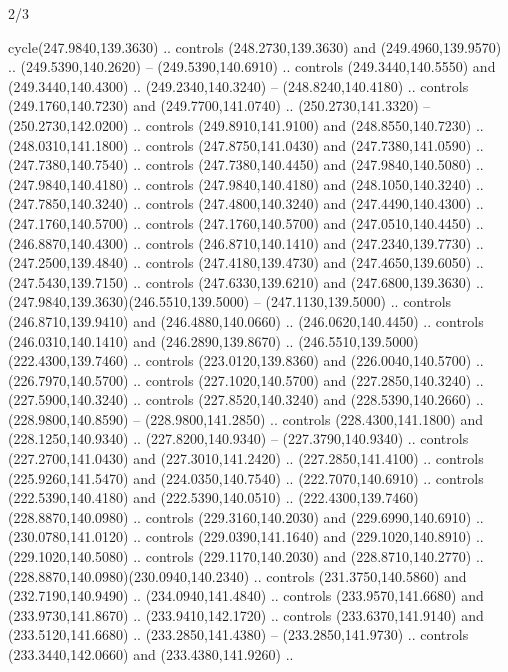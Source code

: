 \begin{flagdescription}{2/3}
\begin{scope}[xshift=0.5\flaglength,yshift=0.5\flagwidth,scale=\flagwidth/259.2]
\begin{scope}[y=0.8pt, x=0.8pt, yscale=-1,shift={(-243,-162)}]
      cycle(247.9840,139.3630) .. controls (248.2730,139.3630) and
      (249.4960,139.9570) .. (249.5390,140.2620) -- (249.5390,140.6910) .. controls
      (249.3440,140.5550) and (249.3440,140.4300) .. (249.2340,140.3240) --
      (248.8240,140.4180) .. controls (249.1760,140.7230) and (249.7700,141.0740) ..
      (250.2730,141.3320) -- (250.2730,142.0200) .. controls (249.8910,141.9100) and
      (248.8550,140.7230) .. (248.0310,141.1800) .. controls (247.8750,141.0430) and
      (247.7380,141.0590) .. (247.7380,140.7540) .. controls (247.7380,140.4450) and
      (247.9840,140.5080) .. (247.9840,140.4180) .. controls (247.9840,140.4180) and
      (248.1050,140.3240) .. (247.7850,140.3240) .. controls (247.4800,140.3240) and
      (247.4490,140.4300) .. (247.1760,140.5700) .. controls (247.1760,140.5700) and
      (247.0510,140.4450) .. (246.8870,140.4300) .. controls (246.8710,140.1410) and
      (247.2340,139.7730) .. (247.2500,139.4840) .. controls (247.4180,139.4730) and
      (247.4650,139.6050) .. (247.5430,139.7150) .. controls (247.6330,139.6210) and
      (247.6800,139.3630) .. (247.9840,139.3630)(246.5510,139.5000) --
      (247.1130,139.5000) .. controls (246.8710,139.9410) and (246.4880,140.0660) ..
      (246.0620,140.4450) .. controls (246.0310,140.1410) and (246.2890,139.8670) ..
      (246.5510,139.5000)(222.4300,139.7460) .. controls (223.0120,139.8360) and
      (226.0040,140.5700) .. (226.7970,140.5700) .. controls (227.1020,140.5700) and
      (227.2850,140.3240) .. (227.5900,140.3240) .. controls (227.8520,140.3240) and
      (228.5390,140.2660) .. (228.9800,140.8590) -- (228.9800,141.2850) .. controls
      (228.4300,141.1800) and (228.1250,140.9340) .. (227.8200,140.9340) --
      (227.3790,140.9340) .. controls (227.2700,141.0430) and (227.3010,141.2420) ..
      (227.2850,141.4100) .. controls (225.9260,141.5470) and (224.0350,140.7540) ..
      (222.7070,140.6910) .. controls (222.5390,140.4180) and (222.5390,140.0510) ..
      (222.4300,139.7460)(228.8870,140.0980) .. controls (229.3160,140.2030) and
      (229.6990,140.6910) .. (230.0780,141.0120) .. controls (229.0390,141.1640) and
      (229.1020,140.8910) .. (229.1020,140.5080) .. controls (229.1170,140.2030) and
      (228.8710,140.2770) .. (228.8870,140.0980)(230.0940,140.2340) .. controls
      (231.3750,140.5860) and (232.7190,140.9490) .. (234.0940,141.4840) .. controls
      (233.9570,141.6680) and (233.9730,141.8670) .. (233.9410,142.1720) .. controls
      (233.6370,141.9140) and (233.5120,141.6680) .. (233.2850,141.4380) --
      (233.2850,141.9730) .. controls (233.3440,142.0660) and (233.4380,141.9260) ..

\end{scope}
\end{scope}
\end{flagdescription}
